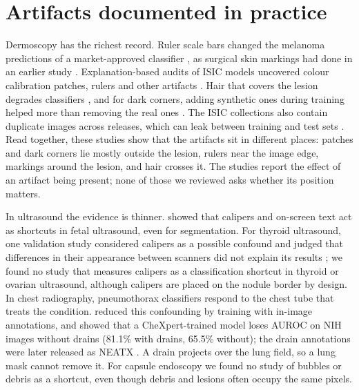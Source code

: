 \documentclass[11pt,a4paper]{article}
\begin{document}
\section{Artifacts documented in practice}
Dermoscopy has the richest record. Ruler scale bars changed the melanoma predictions of a market-approved classifier
\citep{winkler2021scalebars}, as surgical skin markings had done in an earlier study \citep{winkler2019markings}.
Explanation-based audits of ISIC models uncovered colour calibration patches, rulers and other artifacts
\citep{anders2022clever,pahde2023r2r}. Hair that covers the lesion degrades classifiers \citep{wang2024hair}, and for
dark corners, adding synthetic ones during training helped more than removing the real ones \citep{pewton2024dca}. The
ISIC collections also contain duplicate images across releases, which can leak between training and test sets
\citep{cassidy2022isic}. Read together, these studies show that the artifacts sit in different places: patches and dark
corners lie mostly outside the lesion, rulers near the image edge, markings around the lesion, and hair crosses it. The
studies report the effect of an artifact being present; none of those we reviewed asks whether its position matters.

In ultrasound the evidence is thinner. \citet{lin2024segshortcut} showed that calipers and on-screen text act as
shortcuts in fetal ultrasound, even for segmentation. For thyroid ultrasound, one validation study considered calipers
as a possible confound and judged that differences in their appearance between scanners did not explain its results
\citep{weng2023thyroid}; we found no study that measures calipers as a classification shortcut in thyroid or ovarian
ultrasound, although calipers are placed on the nodule border by design.
In chest radiography, pneumothorax classifiers respond to the chest tube that treats the condition.
\citet{rueckel2021pneumothorax} reduced this confounding by training with in-image annotations, and
\citet{jimenez2023shortcuts} showed that a CheXpert-trained model loses AUROC on NIH images without drains
(81.1\% with drains, 65.5\% without); the drain annotations were later released as NEATX \citep{cheplygina2025neatx}. A drain projects over the lung
field, so a lung mask cannot remove it. For capsule endoscopy we found no study of bubbles or debris as a shortcut, even
though debris and lesions often occupy the same pixels.
\end{document}
